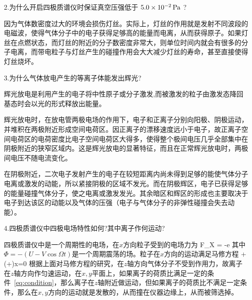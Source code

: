 \documentclass{ctexart}
\begin{document}
2.为什么开启四极质谱仪时保证真空压强低于 $5.0\times 10^{-2}\,\mathrm{Pa}$ ?

因为气体数密度过大的环境会损伤灯丝。实际上，灯丝的作用就是发射不同波段的电磁波，使得气体分子中的电子获得足够高的能量而电离，从而获得原子。如果灯丝在点燃状态，而灯丝的附近的分子数密度非常大，则单位时间内就会有很多的分子电离，而带电粒子与灯丝产生的碰撞作用会大大减少灯丝的寿命，甚至直接使得灯丝烧坏。

3.为什么气体放电产生的等离子体能发出辉光?

辉光放电是利用产生的电子将中性原子或分子激发,而被激发的粒子由激发态降回基态时会以光的形式释放出能量。

辉光放电时，在放电管两极电场的作用下，电子和正离子分别向阳极、阴极运动，并堆积在两极附近形成空间电荷区。因正离子的漂移速度远小于电子，故正离子空间电荷区的电荷密度比电子空间电荷区大得多，使得整个极间电压几乎全部集中在阴极附近的狭窄区域内。这是辉光放电的显著特征，而且在正常辉光放电时，两极间电压不随电流变化。

在阴极附近，二次电子发射产生的电子在较短距离内尚未得到足够的能使气体分子电离或激发的动能，所以紧接阴极的区域不发光。而在阴极辉区，电子已获得足够的能量碰撞气体分子，使之电离或激发发光。其余暗区和辉区的形成也主要取决于电子到达该区的动能以及气体的压强（电子与气体分子的非弹性碰撞会失去动能）。

4.四极质谱仪中四极电场特性如何?其中离子作何运动?

四极质谱仪中是一个周期性的电场，在$x$方向粒子受到的电场力为
\beq
F_X = -e
\eeq
其中$\Phi = -(U-V\cos\Omega t)$是一个周期震荡的场。粒子在$x$方向的运动满足马修方程
\beq
{}+\left(+\right)x=0
\eeq
根据上面对马修方程的研究，在$z$轴方向气体分子不受到作用力，故离子在$z$轴方向作匀速运动，在$x,y$平面上，如果离子的荷质比满足一定的条件~\ref{eq:condition}，那么离子在$z$轴附近做运动，但如果离子的荷质比不满足一定条件，那么在$x,y$方向的运动就是发散的，从而撞在仪器边缘上，从而被筛选掉。


\end{document}
